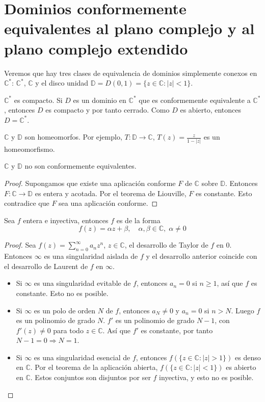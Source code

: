 \section{Dominios conformemente equivalentes al plano complejo y al plano complejo extendido}
Veremos que hay tres clases de equivalencia de dominios simplemente conexos en $\mathbb{C}^\ast$: $\mathbb{C}^\ast$, $\mathbb{C}$ y el disco unidad $\mathbb{D} = D(0, 1) = \{z \in \mathbb{C} : |z| < 1\}$.

$\mathbb{C}^\ast$ es compacto.
Si $D$ es un dominio en $\mathbb{C}^\ast$ que es conformemente equivalente a $\mathbb{C}^\ast$, entonces $D$ es compacto y por tanto cerrado.
Como $D$ es abierto, entonces $D = \mathbb{C}^\ast$.

$\mathbb{C}$ y $\mathbb{D}$ son homeomorfos.
Por ejemplo, $T: \mathbb{D} \to \mathbb{C}$, $T(z) = \frac{z}{1-|z|}$ es un homeomorfismo.

\begin{proposition}
    $\mathbb{C}$ y $\mathbb{D}$ no son conformemente equivalentes.
\end{proposition}

\begin{proof}
    Supongamos que existe una aplicación conforme $F$ de $\mathbb{C}$ sobre $\mathbb{D}$.
    Entonces $F: \mathbb{C} \to \mathbb{D}$ es entera y acotada.
    Por el teorema de Liouville, $F$ es constante.
    Esto contradice que $F$ sea una aplicación conforme.
\end{proof}

\begin{proposition}
    Sea $f$ entera e inyectiva, entonces $f$ es de la forma
    $$f(z) = \alpha z + \beta, \quad \alpha, \beta \in \mathbb{C}, \; \alpha \neq 0$$
\end{proposition}

\begin{proof}
    Sea $f(z) = \sum_{n=0}^\infty a_nz^n$, $z \in \mathbb{C}$, el desarrollo de Taylor de $f$ en 0.
    Entonces $\infty$ es una singularidad aislada de $f$ y el desarrollo anterior coincide con el desarrollo de Laurent de $f$ en $\infty$.
    \begin{itemize}
        \item Si $\infty$ es una singularidad evitable de $f$, entonces $a_n = 0$ si $n \geq 1$, así que $f$ es constante.
              Esto no es posible.
        \item Si $\infty$ es un polo de orden $N$ de $f$, entonces $a_N \neq 0$ y $a_n = 0$ si $n > N$.
              Luego $f$ es un polinomio de grado $N$.
              $f'$ es un polinomio de grado $N-1$, con $f'(z) \neq 0$ para todo $z \in \mathbb{C}$.
              Así que $f'$ es constante, por tanto $N - 1 = 0 \Rightarrow N = 1$.
        \item Si $\infty$ es una singularidad esencial de $f$, entonces $f(\{z \in \mathbb{C} : |z| > 1\})$ es denso en $\mathbb{C}$.
              Por el teorema de la aplicación abierta, $f(\{z \in \mathbb{C} : |z| < 1\})$ es abierto en $\mathbb{C}$.
              Estos conjuntos son disjuntos por ser $f$ inyectiva, y esto no es posible.
    \end{itemize}
\end{proof}

